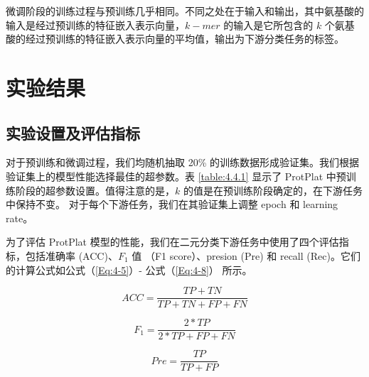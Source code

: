微调阶段的训练过程与预训练几乎相同。不同之处在于输入和输出，其中氨基酸的输入是经过预训练的特征嵌入表示向量，$k-mer$ 的输入是它所包含的 $k$ 个氨基酸的经过预训练的特征嵌入表示向量的平均值，输出为下游分类任务的标签。

\section{实验结果}
\subsection{实验设置及评估指标}
对于预训练和微调过程，我们均随机抽取 20\% 的训练数据形成验证集。我们根据验证集上的模型性能选择最佳的超参数。表 \ref{table:4.4.1} 显示了 ProtPlat 中预训练阶段的超参数设置。值得注意的是，$k$ 的值是在预训练阶段确定的，在下游任务中保持不变。 对于每个下游任务，我们在其验证集上调整 epoch 和 learning rate。

\begin{table}[!htbp]
\centering
{}
\label{table:4.4.1}
\end{table}

为了评估 ProtPlat 模型的性能，我们在二元分类下游任务中使用了四个评估指标，包括准确率 (ACC)、$F_1$ 值 （F1 score）、presion (Pre) 和 recall (Rec)。它们的计算公式如公式（\ref{Eq:4-5}）- 公式（\ref{Eq:4-8}） 所示。

\begin{equation}
    ACC = \frac{TP + TN}{TP + TN + FP + FN}
\label{Eq:4-5}
\end{equation}

\begin{equation}
    F_1 = \frac{2 * TP}{2 * TP + FP + FN}
\label{Eq:4-6}
\end{equation}

\begin{equation}
    Pre = \frac{TP}{TP + FP}
\label{Eq:4-7}
\end{equation}

